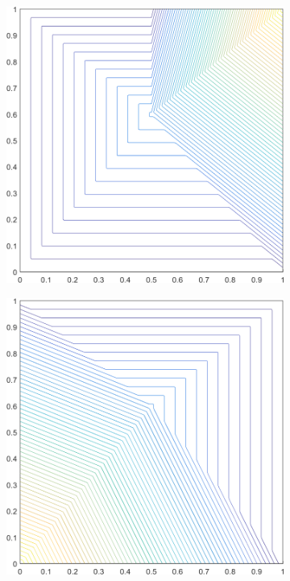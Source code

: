 \begin{figure}
\begin{subfigure}[b]{0.39\textwidth}
		\caption{}
	\end{subfigure}
	\hspace{1.5cm}
	\begin{subfigure}[b]{0.39\textwidth}
		\centering
		\includegraphics[width=\textwidth]{figures/sec_BF/deg_square_PWLD1_contour_b3.png}
		\caption{}
	\end{subfigure}
	\vfill
	\begin{subfigure}[b]{0.39\textwidth}
		\centering
		\includegraphics[width=\textwidth]{figures/sec_BF/deg_square_PWLD1_contour_b1.png}

\end{subfigure}
\end{figure}
